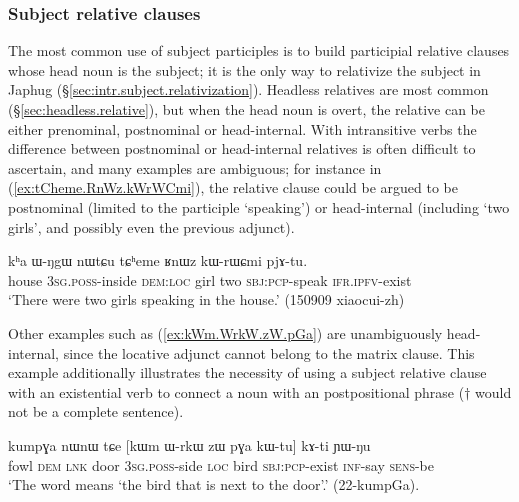 \subsubsection{Subject relative clauses}  \label{sec:subject.participle.subject.relative}
The most common use of subject participles is to build participial relative clauses whose head noun is the subject; it is the only way to relativize the subject in Japhug (§\ref{sec:intr.subject.relativization}). Headless relatives are most common (§\ref{sec:headless.relative}), but when the head noun is overt, the relative can be either prenominal, postnominal or head-internal. With intransitive verbs the difference between postnominal or head-internal relatives is often difficult to ascertain, and many examples are ambiguous; for instance in (\ref{ex:tCheme.RnWz.kWrWCmi}), the relative clause could be argued to be postnominal (limited to the participle  `speaking') or head-internal (including  `two girls', and possibly even the previous adjunct).

\begin{exe}
\ex \label{ex:tCheme.RnWz.kWrWCmi}
 \gll  kʰa ɯ-ŋgɯ nɯtɕu tɕʰeme ʁnɯz kɯ-rɯɕmi pjɤ-tu. \\
 house \textsc{3sg}.\textsc{poss}-inside \textsc{dem}:\textsc{loc} girl two \textsc{sbj}:\textsc{pcp}-speak \textsc{ifr}.\textsc{ipfv}-exist \\
\glt  `There were two girls speaking in the house.' (150909 xiaocui-zh)
\end{exe}

Other examples such as (\ref{ex:kWm.WrkW.zW.pGa}) are unambiguously head-internal, since the locative adjunct  cannot belong to the matrix clause. This example additionally illustrates the necessity of using a subject relative clause with an existential verb to connect a noun with an postpositional phrase ($\dagger$ would not be a complete sentence).

\begin{exe}
\ex \label{ex:kWm.WrkW.zW.pGa}
 \gll  kumpɣa nɯnɯ tɕe [kɯm ɯ-rkɯ zɯ pɣa kɯ-tu] kɤ-ti ɲɯ-ŋu  \\
 fowl \textsc{dem} \textsc{lnk} door \textsc{3sg}.\textsc{poss}-side \textsc{loc} bird \textsc{sbj}:\textsc{pcp}-exist \textsc{inf}-say \textsc{sens}-be \\
 \glt `The word  means `the bird that is next to the door'.' (22-kumpGa). 
\end{exe}

